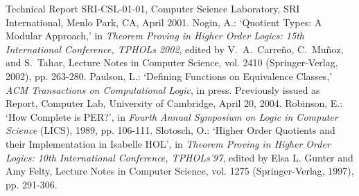 \documentclass[envcountsame,runningheads]{llncs}
\begin{document}
\begin{thebibliography}{5}
Technical Report SRI-CSL-01-01,
Computer Science Laboratory, SRI International,
Menlo Park, CA, April 2001.
%
Nogin, A.:
`Quotient Types: A Modular Approach,' in
{\it Theorem Proving in Higher Order Logics:
15th International Conference, TPHOLs 2002},
edited by V.~A.~Carre\~{n}o, C.~Mu\~{n}oz, and S.~Tahar,
Lecture Notes in Computer Science, vol. 2410
(Springer-Verlag, 2002), pp. 263-280.
%
Paulson, L.:
`Defining Functions on Equivalence Classes,'
{\it ACM Transactions on Computational Logic},
in press.  Previously issued as
Report, Computer Lab, University of Cambridge, April 20, 2004.
%
Robinson, E.:
`How Complete is PER?',
in {\it Fourth Annual Symposium on Logic in Computer Science\/} (LICS),
1989, pp. 106-111.
%
Slotosch, O.:
`Higher Order Quotients and their Implementation in Isabelle HOL', in
{\it Theorem Proving in Higher Order Logics:
10th International Conference, TPHOLs'97},
edited by Elsa L. Gunter and Amy Felty,
Lecture Notes in Computer Science, vol. 1275
(Springer-Verlag, 1997), pp. 291-306.
%
\end{thebibliography}




%
\end{document}
